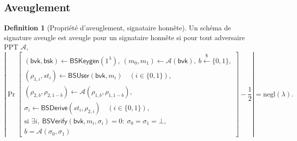 \documentclass[10pt,a4paper]{article}
\theoremstyle{definition}
\newtheorem{definition}{Definition}[section]
\theoremstyle{plain}
\theoremstyle{remark}
\newcommand{\sample}{\xleftarrow{\$}}
\newcommand{\negl}{\mathrm{negl}}
\begin{document}
\subsection{Aveuglement}\label{sec:blindness}


\begin{definition}[Propriété d'aveuglement, signataire honnête] \cite{jlo1997}
Un schéma de signature aveugle est aveugle pour un signataire honnête si
pour tout adversaire PPT $\mathcal A$,
\[
\left|
\Pr\!\left[
\begin{array}{l}
(\mathsf{bvk},\mathsf{bsk})\gets\mathsf{BSKeygen}(1^\lambda),\
(m_0,m_1)\gets\mathcal A(\mathsf{bvk}),\
b\sample\{0,1\},\\
(\rho_{1,i},st_i)\gets\mathsf{BSUser}(\mathsf{bvk},m_i)
\quad(i\in\{0,1\}),\\
(\rho_{2,b},\rho_{2,1-b})\gets
\mathcal A(\rho_{1,b},\rho_{1,1-b}),\\
\sigma_i\gets\mathsf{BSDerive}(st_i,\rho_{2,i})
\quad(i\in\{0,1\}),\\
\text{si }\exists i,\
\mathsf{BSVerify}(\mathsf{bvk},m_i,\sigma_i)=0:
\ \sigma_0=\sigma_1=\bot,\\
b=\mathcal A(\sigma_0,\sigma_1)
\end{array}
\right]
-\frac12
\right|
=\negl(\lambda).
\]
\end{definition}
\end{document}
